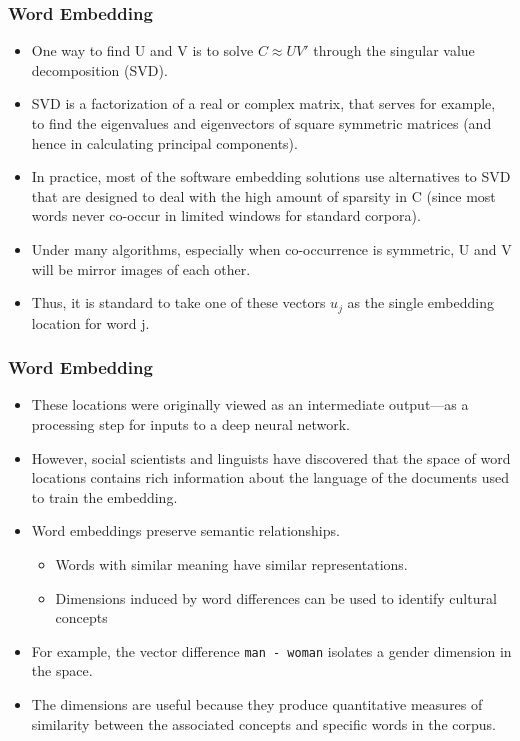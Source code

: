 \documentclass[
  shownotes,
  xcolor={svgnames},
  hyperref={colorlinks,citecolor=DarkBlue,linkcolor=DarkRed,urlcolor=DarkBlue}
  , aspectratio=169]{beamer}
\begin{document}
\begin{frame}
\frametitle{Word Embedding }

\begin{itemize}
\item One way to find U and V is to solve $C\approx UV'$ through the singular value decomposition (SVD).
\item SVD is a factorization of a real or complex matrix, that serves for example, to find the eigenvalues and eigenvectors of square symmetric matrices (and hence in calculating principal components). 
\item In practice, most of the software embedding solutions use alternatives to SVD that are designed to deal with the high amount of sparsity in C (since most words never co-occur in limited windows for standard corpora). 

\item Under many algorithms, especially when co-occurrence is symmetric, U and V will be mirror images of each other. 
\item Thus, it is standard to take one of these vectors $u_j$ as the single embedding location for word j.
\end{itemize}


\end{frame}
\begin{frame}
\frametitle{Word Embedding }

\begin{itemize}


 \item These locations were originally viewed as an intermediate output—as a processing step for inputs to a deep neural network.
\item However, social scientists and linguists have discovered that the space of word locations contains rich information about the language of the documents used to train the embedding. 


\item Word embeddings preserve semantic relationships.
  \begin{itemize}
    \item Words with similar meaning have similar representations.
    \medskip
    \item Dimensions induced by word differences can be used to identify cultural concepts 
  \end{itemize}
  \item For example, the vector difference \texttt{man - woman} isolates a gender dimension in the space.
  \medskip
  \item  The dimensions are useful because they produce quantitative measures of similarity between the associated concepts and specific words in the corpus. 
  \end{itemize}


\end{frame}
\end{document}
